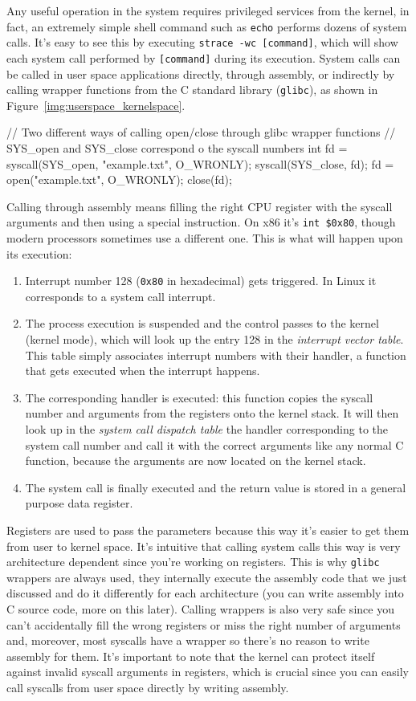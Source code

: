 \documentclass[10pt]{book}
\begin{document}
Any useful operation in the system requires privileged services from the kernel, in fact, an extremely simple shell command such as \verb|echo| performs dozens of system calls. It's easy to see this by executing \verb|strace -wc [command]|, which will show each system call performed by \verb|[command]| during its execution. System calls can be called in user space applications directly, through assembly, or indirectly by calling wrapper functions from the C standard library (\verb|glibc|), as shown in Figure~\ref{img:userspace_kernelspace}. 
\begin{code}
// Two different ways of calling open/close through glibc wrapper functions 
// SYS_open and SYS_close correspond o the syscall numbers
int fd = syscall(SYS_open, "example.txt", O_WRONLY);
syscall(SYS_close, fd);
fd = open("example.txt", O_WRONLY);
close(fd);
\end{code}
Calling through assembly means filling the right CPU register with the syscall arguments and then using a special instruction. On x86 it's \verb|int $0x80|, though modern processors sometimes use a different one. This is what will happen upon its execution:
\begin{enumerate}
    \item Interrupt number 128 (\verb|0x80| in hexadecimal) gets triggered. In Linux it corresponds to a system call interrupt. 
    \item The process execution is suspended and the control passes to the kernel (kernel mode), which will look up the entry 128 in the \textit{interrupt vector table}. This table simply associates interrupt numbers with their handler, a function that gets executed when the interrupt happens.
    \item The corresponding handler is executed: this function copies the syscall number and arguments from the registers onto the kernel stack. It will then look up in the \textit{system call dispatch table} the handler corresponding to the system call number and call it with the correct arguments like any normal C function, because the arguments are now located on the kernel stack.
    \item The system call is finally executed and the return value is stored in a general purpose data register.
\end{enumerate}
Registers are used to pass the parameters because this way it's easier to get them from user to kernel space. It's intuitive that calling system calls this way is very architecture dependent since you're working on registers. This is why \verb|glibc| wrappers are always used, they internally execute the assembly code that we just discussed and do it differently for each architecture (you can write assembly into C source code, more on this later). Calling wrappers is also very safe since you can't accidentally fill the wrong registers or miss the right number of arguments and, moreover, most syscalls have a wrapper so there's no reason to write assembly for them. It's important to note that the kernel can protect itself against invalid syscall arguments in registers, which is crucial since you can easily call syscalls from user space directly by writing assembly.
\end{document}
